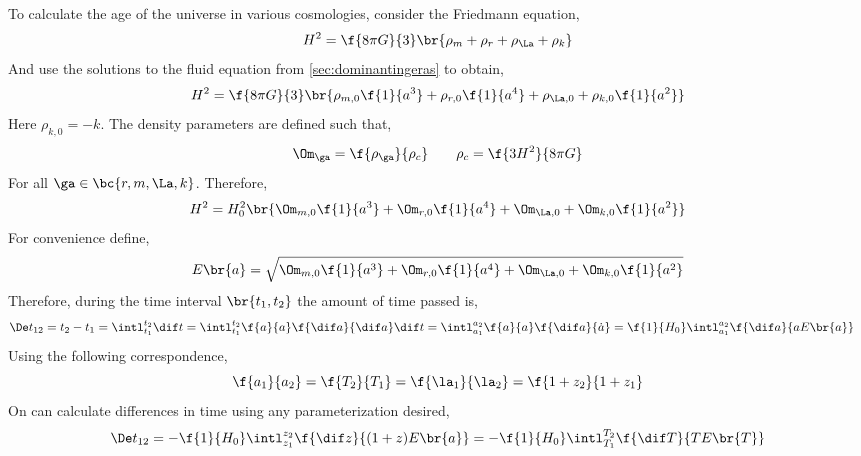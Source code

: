 \documentclass{article}
\begin{document}
To calculate the age of the universe in various cosmologies, consider the Friedmann equation,
\[ H^2 = \f{8 \pi G}{3} \br{\rho_m + \rho_r + \rho_\La + \rho_k} \]
And use the solutions to the fluid equation from \cref{sec:dominantingeras} to obtain,
\[ H^2 = \f{8 \pi G}{3} \br{\rho_{m,0}\f{1}{a^3} + \rho_{r,0}\f{1}{a^4} + \rho_{\La,0} + \rho_{k,0}\f{1}{a^2} } \]
Here $\rho_{k,0} = -k$. The density parameters are defined such that,
\[ \Om_{\ga} = \f{\rho_{\ga}}{\rho_{c}} \qquad \rho_{c} = \f{3 H^2}{8 \pi G} \]
For all $\ga \in \bc{r, m , \La, k}$. Therefore,
\[ H^2 = H_0^2\br{\Om_{m,0}\f{1}{a^3} + \Om_{r,0}\f{1}{a^4} + \Om_{\La,0} + \Om_{k,0}\f{1}{a^2} } \]
For convenience define,
\[ E\br{a} = \sqrt{\Om_{m,0}\f{1}{a^3} + \Om_{r,0}\f{1}{a^4} + \Om_{\La,0} + \Om_{k,0}\f{1}{a^2} } \]
Therefore, during the time interval $\br{t_1, t_2}$ the amount of time passed is,
\begin{align*}
    \De t_{12}
    &= t_2 - t_1 = \intl_{t_1}^{t_2} \dif t = \intl_{t_1}^{t_2} \f{a}{a} \f{\dif a}{\dif a} \dif t = \intl_{a_1}^{a_2} \f{a}{a} \f{\dif a}{\dot a} = \f{1}{H_0}\intl_{a_1}^{a_2} \f{\dif a}{a E\br{a}}
\end{align*}
Using the following correspondence,
\[ \f{a_1}{a_2} = \f{T_2}{T_1} = \f{\la_1}{\la_2} = \f{1 + z_2}{1 + z_1} \]
On can calculate differences in time using any parameterization desired,
\[ \De t_{12} = -\f{1}{H_0} \intl_{z_1}^{z_2} \f{\dif z}{(1+z) E\br{a}} = -\f{1}{H_0}\intl_{T_1}^{T_2} \f{\dif T}{T E\br{T}} \]
\end{document}
